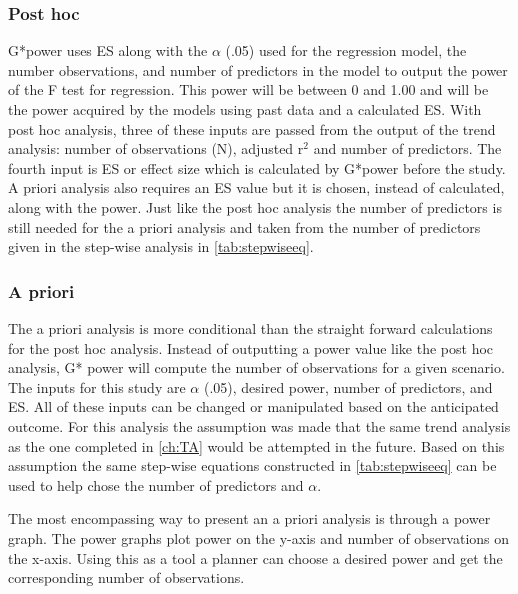 \subsubsection{Post hoc}

G*power uses ES along with the $\alpha$ (.05) used for the regression model, the number observations, and number of predictors in the model to output the power of the F test for regression.
This power will be between 0 and 1.00 and will be the power acquired by the models using past data and a calculated ES.
With post hoc analysis, three of these inputs are passed from the output of the trend analysis: number of observations (N), adjusted r$^2$ and number of predictors.
The fourth input is ES or effect size which is calculated by G*power before the study.
A priori analysis also requires an ES value but it is chosen, instead of calculated, along with the power.
Just like the post hoc analysis the number of predictors is still needed for the a priori analysis and taken from the number of predictors given in the step-wise analysis in \autoref{tab:stepwiseeq}.

\subsubsection{A priori}

The a priori analysis is more conditional than the straight forward calculations for the post hoc analysis.
Instead of outputting a power value like the post hoc analysis, G* power will compute the number of observations for a given scenario. 
The inputs for this study are $\alpha$ (.05), desired power, number of predictors, and ES.
All of these inputs can be changed or manipulated based on the anticipated outcome.
For this analysis the assumption was made that the same trend analysis as the one completed in \autoref{ch:TA} would be attempted in the future.
Based on this assumption the same step-wise equations constructed in \autoref{tab:stepwiseeq} can be used to help chose the number of predictors and $\alpha$.

The most encompassing way to present an a priori analysis is through a power graph.
The power graphs plot power on the y-axis and number of observations on the x-axis.
Using this as a tool a planner can choose a desired power and get the corresponding number of observations.

